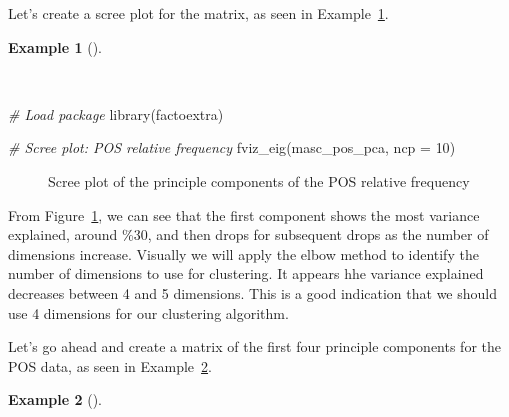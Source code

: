 \documentclass[
  letterpaper,
  DIV=11,
  numbers=noendperiod]{scrreprt}
\newenvironment{Shaded}{\begin{snugshade}}{\end{snugshade}}
\newcommand{\AttributeTok}[1]{\textcolor[rgb]{0.00,0.00,0.00}{#1}}
\newcommand{\CommentTok}[1]{\textcolor[rgb]{0.00,0.00,0.00}{\textit{#1}}}
\newcommand{\DecValTok}[1]{\textcolor[rgb]{0.00,0.00,0.00}{#1}}
\newcommand{\FunctionTok}[1]{\textcolor[rgb]{0.00,0.00,0.00}{#1}}
\newcommand{\NormalTok}[1]{\textcolor[rgb]{0.00,0.00,0.00}{#1}}
\newcommand{\OtherTok}[1]{\textcolor[rgb]{0.00,0.00,0.00}{#1}}
\newcommand{\SpecialCharTok}[1]{\textcolor[rgb]{0.00,0.00,0.00}{#1}}
\theoremstyle{definition}
\newtheorem{example}{Example}[chapter]
\theoremstyle{remark}
\begin{document}
Let's create a scree plot for the matrix, as seen in
Example~\ref{exm-eda-masc-dtms-pca-scree}.

\begin{example}[]\protect\hypertarget{exm-eda-masc-dtms-pca-scree}{}\label{exm-eda-masc-dtms-pca-scree}

~

\begin{Shaded}
\begin{Highlighting}[]
\CommentTok{\# Load package}
\FunctionTok{library}\NormalTok{(factoextra)}

\CommentTok{\# Scree plot: POS relative frequency}
\FunctionTok{fviz\_eig}\NormalTok{(masc\_pos\_pca, }\AttributeTok{ncp =} \DecValTok{10}\NormalTok{)}
\end{Highlighting}
\end{Shaded}

\begin{figure}[H]


\caption{\label{fig-eda-masc-dtms-pca-scree}Scree plot of the principle
components of the POS relative frequency}

\end{figure}%

\end{example}

From Figure~\ref{fig-eda-masc-dtms-pca-scree}, we can see that the first
component shows the most variance explained, around \%30, and then drops
for subsequent drops as the number of dimensions increase. Visually we
will apply the elbow method to identify the number of dimensions to use
for clustering. It appears hhe variance explained decreases between 4
and 5 dimensions. This is a good indication that we should use 4
dimensions for our clustering algorithm.

Let's go ahead and create a matrix of the first four principle
components for the POS data, as seen in
Example~\ref{exm-eda-masc-pos-pca-pc}.

\begin{example}[]\protect\hypertarget{exm-eda-masc-pos-pca-pc}{}\label{exm-eda-masc-pos-pca-pc}

~

\begin{Shaded}
\end{Shaded}

\end{example}
\end{document}
